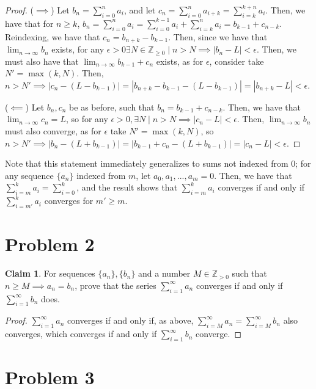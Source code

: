 \documentclass[12pt,letterpaper]{article}
\theoremstyle{definition}
\newtheorem*{claim}{Claim}
\newcommand{\Ze}{\mathbb{Z}_{\geq 0}}
\newcommand{\Zg}{\mathbb{Z}_{>0}}
\begin{document}
\begin{proof}
  ($\implies$) Let $b_n = \sum_{i=0}^na_i$, and let $c_n = \sum_{i=0}^na_{i+k} =
  \sum_{i=k}^{k+n}a_i$.
  Then, we have that for $n \geq k$, $b_n = \sum_{i=0}^na_i = \sum_{i=0}^{k-1}
  a_i + \sum_{i=k}^n a_i = b_{k-1} + c_{n-k}$. Reindexing, we have that $c_{n} =
  b_{n+k} - b_{k-1}$. Then, since we have that
  $\lim_{n\rightarrow \infty} b_n$ exists, for any $\epsilon > 0 \exists N \in
  \Ze \mid n > N \implies |b_n - L| < \epsilon$. Then, we must also have that
  $\lim_{n\rightarrow \infty} b_{k-1} + c_n$ exists, as for $\epsilon$, consider 
  take $N' = \max(k, N)$. Then, $n > N' \implies |c_n - (L - b_{k-1})| =
  |b_{n+k} - b_{k-1} - (L - b_{k-1})| = |b_{n+k} - L| < \epsilon$.

  ($\impliedby$) Let $b_n, c_n$ be as before, such that $b_n = b_{k-1} +
  c_{n-k}$.  Then, we have that $\lim_{n\rightarrow \infty} c_n = L$, so for any
  $\epsilon > 0, \exists N \mid n > N \implies |c_n - L| < \epsilon$. Then,
  $\lim_{n\rightarrow \infty}b_n$ must also converge, as for $\epsilon$ take $N'
  = \max(k, N)$, so $n > N' \implies |b_n - (L + b_{k-1})| = |b_{k-1} + c_n - (L
  + b_{k-1})| = |c_n - L| < \epsilon$.
\end{proof}

Note that this statement immediately generalizes to sums not indexed from 0;
for any sequence $\{a_n\}$ indexed from $m$, let $a_0, a_1,...,a_m = 0$. Then,
we have that $\sum_{i=m}^k a_i = \sum_{i=0}^k$, and the result shows that
$\sum_{i=m}^k a_i$ converges if and only if $\sum_{i=m'}^k a_i$ converges for
$m' \geq m$.

\section*{Problem 2}

\begin{claim}
  For sequences $\{ a_n \}, \{ b_n \}$ and a number $M \in \Zg$ such that $n
  \geq M \implies a_n = b_n$, prove that the series $\sum_{i=1}^\infty a_n$
  converges if and only if $\sum_{i=1}^\infty b_n$ does.
\end{claim}

\begin{proof}
  $\sum_{i=1}^\infty a_n$ converges if and only if, as above, $\sum_{i=M}^\infty
  a_n = \sum_{i=M}^\infty b_n$ also converges, which converges if and only if
  $\sum_{i=1}^\infty b_n$ converge.
\end{proof}

\section*{Problem 3}
\end{document}
